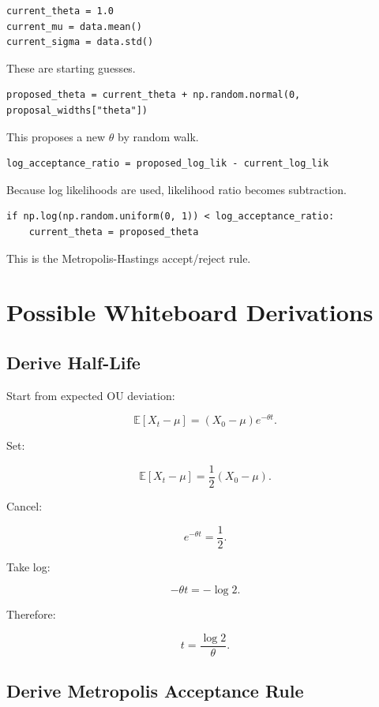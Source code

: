 \documentclass[11pt]{article}
\newcommand{\E}{\mathbb{E}}
\begin{document}
\begin{lstlisting}[style=pythonstyle]
current_theta = 1.0
current_mu = data.mean()
current_sigma = data.std()
\end{lstlisting}

These are starting guesses.

\begin{lstlisting}[style=pythonstyle]
proposed_theta = current_theta + np.random.normal(0, proposal_widths["theta"])
\end{lstlisting}

This proposes a new $\theta$ by random walk.

\begin{lstlisting}[style=pythonstyle]
log_acceptance_ratio = proposed_log_lik - current_log_lik
\end{lstlisting}

Because log likelihoods are used, likelihood ratio becomes subtraction.

\begin{lstlisting}[style=pythonstyle]
if np.log(np.random.uniform(0, 1)) < log_acceptance_ratio:
    current_theta = proposed_theta
\end{lstlisting}

This is the Metropolis-Hastings accept/reject rule.

\section{Possible Whiteboard Derivations}

\subsection{Derive Half-Life}

Start from expected OU deviation:

\[
\E[X_t-\mu] = (X_0-\mu)e^{-\theta t}.
\]

Set:

\[
\E[X_t-\mu] = \frac{1}{2}(X_0-\mu).
\]

Cancel:

\[
e^{-\theta t}=\frac{1}{2}.
\]

Take log:

\[
-\theta t = -\log 2.
\]

Therefore:

\[
t=\frac{\log 2}{\theta}.
\]

\subsection{Derive Metropolis Acceptance Rule}
\end{document}
